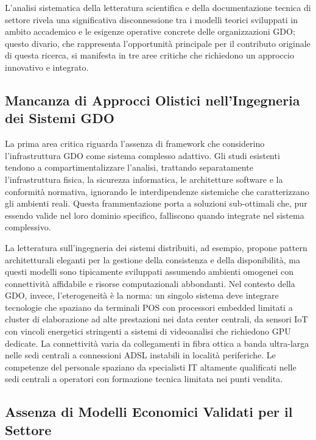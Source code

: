 L'analisi sistematica della letteratura scientifica e della documentazione tecnica di settore rivela una significativa disconnessione tra i modelli teorici sviluppati in ambito accademico e le esigenze operative concrete delle organizzazioni GDO; questo divario, che rappresenta l'opportunità principale per il contributo originale di questa ricerca, si manifesta in tre aree critiche che richiedono un approccio innovativo e integrato.

\subsection{Mancanza di Approcci Olistici nell'Ingegneria dei Sistemi GDO}

La prima area critica riguarda l'assenza di framework che considerino l'infrastruttura GDO come sistema complesso adattivo. Gli studi esistenti tendono a compartimentalizzare l'analisi, trattando separatamente l'infrastruttura fisica, la sicurezza informatica, le architetture software e la conformità normativa, ignorando le interdipendenze sistemiche che caratterizzano gli ambienti reali. Questa frammentazione porta a soluzioni sub-ottimali che, pur essendo valide nel loro dominio specifico, falliscono quando integrate nel sistema complessivo.

La letteratura sull'ingegneria dei sistemi distribuiti, ad esempio, propone pattern architetturali eleganti per la gestione della consistenza e della disponibilità, ma questi modelli sono tipicamente sviluppati assumendo ambienti omogenei con connettività affidabile e risorse computazionali abbondanti. Nel contesto della GDO, invece, l'eterogeneità è la norma: un singolo sistema deve integrare tecnologie che spaziano da terminali POS con processori embedded limitati a cluster di elaborazione ad alte prestazioni nei data center centrali, da sensori IoT con vincoli energetici stringenti a sistemi di videoanalisi che richiedono GPU dedicate. La connettività varia da collegamenti in fibra ottica a banda ultra-larga nelle sedi centrali a connessioni ADSL instabili in località periferiche. Le competenze del personale spaziano da specialisti IT altamente qualificati nelle sedi centrali a operatori con formazione tecnica limitata nei punti vendita.

\subsection{Assenza di Modelli Economici Validati per il Settore}

